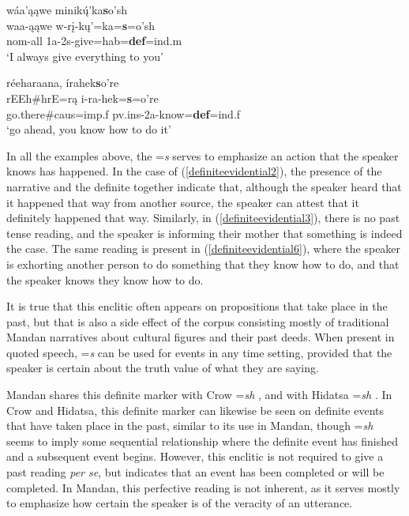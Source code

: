 \begin{exe}
\begin{xlist}
	\item\label{definiteevidential5}
	\glll wáa'ąąwe minikų́'ka\textbf{s}o'sh\\
	waa-ąąwe w-rį-kų'=ka=\textbf{s}=o'sh\\
	nom-\textnormal{all} 1a-2s-\textnormal{give}=hab=\textbf{def}=ind.m\\
	\glt `I always give everything to you' \citep[98]{hollow1973b}

	\item\label{definiteevidential6}
	\glll réeharaana, írahek\textbf{s}o're\\
	rEEh\#hrE=rą i-ra-hek=\textbf{s}=o're\\
	\textnormal{go.there}\#caus=imp.f pv.ins-2a-\textnormal{know}=\textbf{def}=ind.f\\
	\glt `go ahead, you know how to do it' \citep[181]{hollow1973b}
	
	\end{xlist}

\end{exe}

In all the examples above, the =\textit{s} serves to emphasize an action that the speaker knows has happened. In the case of (\ref{definiteevidential2}), the presence of the narrative and the definite together indicate that, although the speaker heard that it happened that way from another source, the speaker can attest that it definitely happened that way. Similarly, in (\ref{definiteevidential3}), there is no past tense reading, and the speaker is informing their mother that something is indeed the case. The same reading is present in (\ref{definiteevidential6}), where the speaker is exhorting another person to do something that they know how to do, and that the speaker knows they know how to do. 

It is true that this enclitic often appears on propositions that take place in the past, but that is also a side effect of the corpus consisting mostly of traditional Mandan narratives about cultural figures and their past deeds. When present in quoted speech, =\textit{s} can be used for events in any time setting, provided that the speaker is certain about the truth value of what they are saying.

Mandan shares this definite marker with Crow =\textit{sh} \citep[156]{graczyk2007}, and with Hidatsa =\textit{sh} \citep[530]{park2012}. In Crow and Hidatsa, this definite marker can likewise be seen on definite events that have taken place in the past, similar to its use in Mandan, though =\textit{sh} seems to imply some sequential relationship where the definite event has finished and a subsequent event begins. However, this enclitic is not required to give a past reading \textit{per se}, but indicates that an event has been completed or will be completed. In Mandan, this perfective reading is not inherent, as it serves mostly to emphasize how certain the speaker is of the veracity of an utterance.

